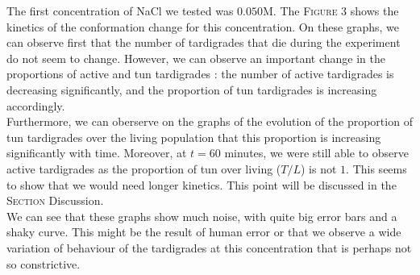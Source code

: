 \documentclass[12pt,a4paper, twocolumn]{article}
\begin{document}
The first concentration of NaCl we tested was $0.050$M. The \textsc{Figure} 3 shows the kinetics of the conformation change for this concentration. On these graphs, we can observe first that the number of tardigrades that die during the experiment do not seem to change. However, we can observe an important change in the proportions of active and tun tardigrades : the number of active tardigrades is decreasing significantly, and the proportion of tun tardigrades is increasing accordingly.\\
Furthermore, we can oberserve on the graphs of the evolution of the proportion of tun tardigrades over the living population that this proportion is increasing significantly with time. Moreover, at $t=60$ minutes, we were still able to observe active tardigrades as the proportion of tun over living ($T/L$) is not $1$. This seems to show that we would need longer kinetics. This point will be discussed in the \textsc{Section} Discussion.\\
We can see that these graphs show much noise, with quite big error bars and a shaky curve. This might be the result of human error or that we observe a wide variation of behaviour of the tardigrades at this concentration that is perhaps not so constrictive.
\end{document}
